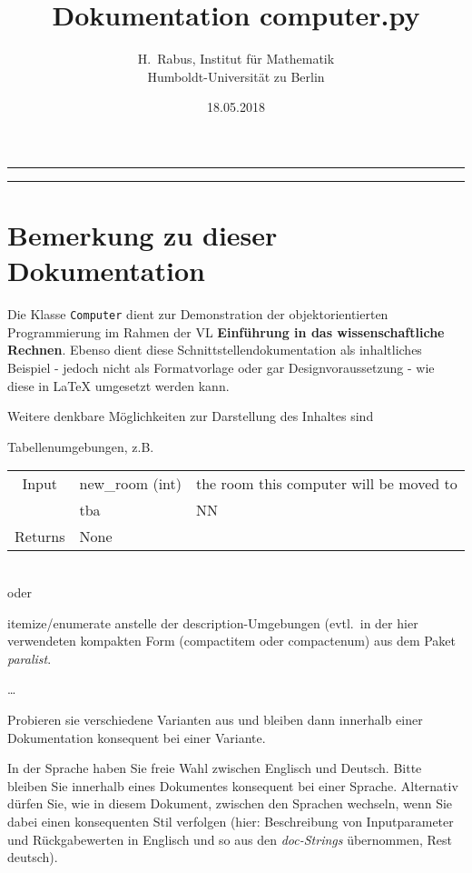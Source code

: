 \documentclass[smallheadings]{scrartcl}
\title{Dokumentation computer.py}
\author{%
  H.\ Rabus, Institut f\"ur Mathematik\\ Humboldt-Universit\"at zu Berlin
}
\date{18.05.2018}
\begin{document}
\maketitle
\tableofcontents
\bigskip

\hrule
\hrule


\section*{Bemerkung zu dieser Dokumentation}

Die Klasse \texttt{Computer} dient zur Demonstration der objektorientierten Programmierung im Rahmen der VL \textbf{Einf\"uhrung in das wissenschaftliche Rechnen}. Ebenso dient diese Schnittstellendokumentation als inhaltliches Beispiel - jedoch nicht als Formatvorlage oder gar Designvoraussetzung  -  wie diese in \LaTeX{} umgesetzt werden kann. 

Weitere denkbare M\"oglichkeiten zur Darstellung des Inhaltes sind 
\begin{compactitem}
	\item Tabellenumgebungen, z.B.\ \\
		\begin{tabular}{|c|ll|}
			\hline
			Input & new\_room (int) & the room this computer will be moved to\\
			      & tba & NN \\
			      \hline
			Returns & None & \\
			      \hline
		\end{tabular}
		\\
		oder
	\item itemize/enumerate anstelle der description-Umgebungen (evtl.\ in der hier verwendeten kompakten Form (compactitem oder compactenum) aus dem Paket \textit{paralist}.
	\item \ldots
\end{compactitem}
Probieren sie verschiedene Varianten aus und bleiben dann innerhalb einer Dokumentation konsequent bei einer Variante.

In der Sprache haben Sie freie Wahl zwischen Englisch und Deutsch. Bitte bleiben Sie innerhalb eines Dokumentes konsequent bei einer Sprache. Alternativ d\"urfen Sie, wie in diesem Dokument, zwischen den Sprachen wechseln, wenn Sie dabei einen konsequenten Stil verfolgen (hier: Beschreibung von Inputparameter und R\"uckgabewerten in Englisch und so aus den \textit{doc-Strings} \"ubernommen, Rest deutsch).
\end{document}

